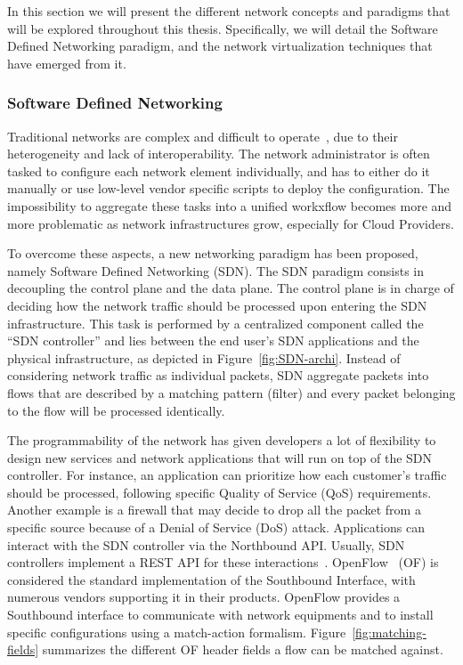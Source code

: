 In this section we will present the different network concepts and paradigms that will be explored throughout this thesis.
Specifically, we will detail the Software Defined Networking paradigm, and the network virtualization techniques that have emerged from it.

\subsubsection{Software Defined Networking}

Traditional networks are complex and difficult to operate~\cite{complexnetworks}, due to their heterogeneity and lack of interoperability. The network administrator is often tasked to configure each network element individually, and has to either do it manually or use low-level vendor specific scripts to deploy the configuration. The impossibility to aggregate these tasks into a unified workxflow becomes more and more problematic as network infrastructures grow, especially for Cloud Providers.

To overcome these aspects, a new networking paradigm has been proposed, namely Software Defined Networking (SDN).
The SDN paradigm consists in decoupling the control plane and the data plane.
The control plane is in charge of deciding how the network traffic should be processed upon entering the SDN infrastructure.
This task is performed by a centralized component called the ``SDN controller'' and lies between the end user's SDN applications and the physical infrastructure, as depicted in Figure~\ref{fig:SDN-archi}. Instead of considering network traffic as individual packets, SDN aggregate packets into flows that are described by a matching pattern (filter) and every packet belonging to the flow will be processed identically. 



The programmability of the network has given developers a lot of flexibility to design new services and network applications that will run on top of the SDN controller.
For instance, an application can prioritize how each customer's traffic should be processed, following specific Quality of Service (QoS) requirements.
Another example is a firewall that may decide to drop all the packet from a specific source because of a Denial of Service (DoS) attack.
Applications can interact with the SDN controller via the Northbound API.
Usually, SDN controllers implement a REST API for these interactions~\cite{onos-Berde2014a,opendaylight,floodlight}.
OpenFlow~\cite{Openflow-McKeown2008} (OF) is considered the standard implementation of the Southbound Interface, with numerous vendors supporting it in their products.
OpenFlow provides a Southbound interface to communicate with network equipments and to install specific configurations using a match-action formalism.
Figure~\ref{fig:matching-fields} summarizes the different OF header fields a flow can be matched against.

